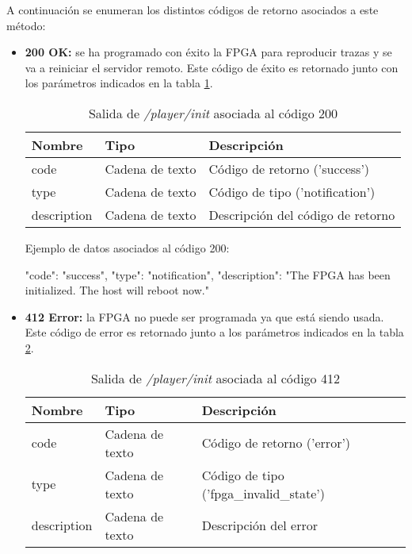 A continuación se enumeran los distintos códigos de retorno asociados a este método:
\begin{itemize}

\item{\textbf{200 OK:} se ha programado con éxito la \gls{FPGA} para reproducir \glspl{traza} y se va a reiniciar el servidor remoto. Este código de éxito es retornado junto con los parámetros indicados en la tabla \ref{extra:api:playerinit:ok}.
\begin{table}[H]
\centering
\begin{tabular}{|l|l|l|}
\hline
\rowcolor[HTML]{F5F5F5}
\textbf{Nombre}  & \textbf{Tipo}   & \textbf{Descripción}              \\ \hline
code             & Cadena de texto & Código de retorno ('success')     \\ \hline
type             & Cadena de texto & Código de tipo ('notification')   \\ \hline
description      & Cadena de texto & Descripción del código de retorno \\ \hline
\end{tabular}
\caption{Salida de \textit{/player/init} asociada al código 200}
\label{extra:api:playerinit:ok}
\end{table}
\begin{minipage}{\textwidth}
Ejemplo de datos asociados al código 200:

\begin{code}[language=json]
{
  "code": "success",
  "type": "notification",
  "description": "The FPGA has been initialized. The host will reboot now."
}
\end{code}
\end{minipage}
}

\item{\textbf{412 Error:} la \gls{FPGA} no puede ser programada ya que está siendo usada. Este código de error es retornado junto a los parámetros indicados en la tabla \ref{extra:api:playerinit:error}.
\begin{table}[H]
\centering
\begin{tabular}{|l|l|l|}
\hline
\rowcolor[HTML]{F5F5F5}
\textbf{Nombre}  & \textbf{Tipo}   & \textbf{Descripción}                    \\ \hline
code             & Cadena de texto & Código de retorno ('error')             \\ \hline
type             & Cadena de texto & Código de tipo ('fpga\_invalid\_state') \\ \hline
description      & Cadena de texto & Descripción del error                   \\ \hline
\end{tabular}
\caption{Salida de \textit{/player/init} asociada al código 412}
\label{extra:api:playerinit:error}
\end{table}

}
\end{itemize}

